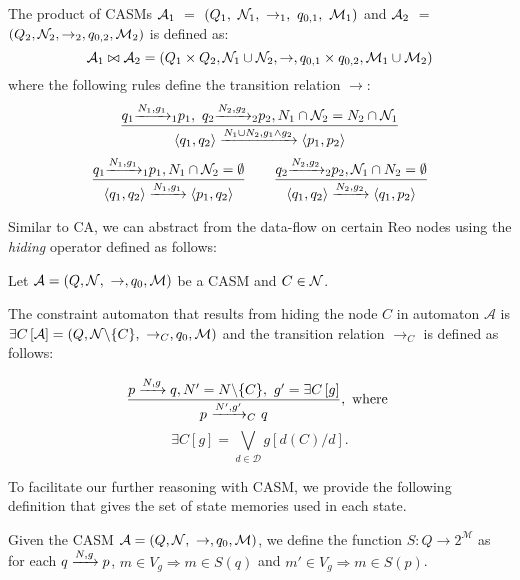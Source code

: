 \begin{definition}\label{def:productCA} The product of CASMs $\mathcal{A}_1$ $=$ $(Q_1,\ \N_1,\ \rightarrow_1,\ q_{0,1},\ \mathcal{M}_1)$ and $\mathcal{A}_2$ $=$ $(Q_2, \mathcal{N}_2, \rightarrow_2, q_{0,2}, \mathcal{M}_2)$ is defined as: 
\[\mathcal{A}_1 \bowtie \mathcal{A}_2 = (Q_1 \times Q_2, \mathcal{N}_1 \cup \mathcal{N}_2, \rightarrow, q_{0,1} \times q_{0,2}, \mathcal{M}_1 \cup \mathcal{M}_2)\] where the following rules define the transition relation $\rightarrow$:
$$\frac{\longtransitionno{q_1}{N_1,g_1}{1}{p_1},\ \longtransitionno{q_2}{N_2,g_2}{2}{p_2},N_1\cap \N_2=N_2\cap \N_1}{\longtransition{\langle q_1,q_2 \rangle}{N_1\cup N_2,g_1\wedge g_2}{\langle p_1,p_2 \rangle}}$$
$$ \frac{q_1{\xrightarrow{N_1,g_1}_{1}}p_1,N_1\cap \mathcal{N}_2=\emptyset}{\langle q_1,q_2 \rangle\xrightarrow{N_1,g_1}\langle p_1,q_2 \rangle} \ \ \ \ \ \   
\frac{q_2{\xrightarrow{N_2,g_2}_{2}}p_2,\mathcal{N}_1\cap N_2=\emptyset}{\langle q_1,q_2 \rangle\xrightarrow{N_2,g_2}\langle q_1,p_2 \rangle}$$
\end{definition} 

Similar to CA, we can abstract from the data-flow on certain Reo nodes using the \emph{hiding} operator defined as follows:

\begin{definition}
Let $\mathcal{A}=(Q, \mathcal{N},\ \rightarrow, q_{0}, \mathcal{M})$ be a CASM and $C \in \mathcal{N}$. 

The constraint automaton that results from hiding the node $C$ in automaton $\mathcal{A}$ is
$\exists C \left[\mathcal{A}\right] = (Q, \mathcal{N} \backslash \{C\},\ \rightarrow_C, q_{0}, \mathcal{M})$ and the transition relation $\longrightarrow_C$ is defined as follows:


$$\dfrac{p\xrightarrow{N,g}q, N' = N \backslash \{C\},\ g' = \exists C\left[g\right]}{p~ {\xrightarrow{N',g'}_{C}} ~q},\text{ where }$$ $$ \exists C \left[g\right] = \underset{d \in \mathcal{D}}{\bigvee} g\left[d\left(C\right)\slash d\right].$$
\end{definition}

To facilitate our further reasoning with CASM, we provide the following definition that gives the set of state memories used in each state.

\begin{definition}
\label{def:statevars}
Given the CASM $\mathcal{A}=(Q, \mathcal{N},\ \rightarrow, q_{0}, \mathcal{M})$, we define the function $S : Q \rightarrow 2^{\mathcal{M}}$ as for each $q\xrightarrow{N,g}p$, $m \in V_{g} \Rightarrow m \in S\left(q\right)$ and 
$m' \in V_{g} \Rightarrow m \in S\left(p\right)$.
\end{definition} 

